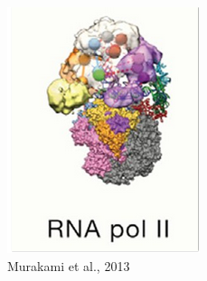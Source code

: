 \begin{frame}
\begin{figure}[h]
\begin{subfigure}[b]{0.3\textwidth}
            \includegraphics[width=\textwidth]{images/two.png}
            \caption{Murakami et al., 2013}
            \label{fig:image2}
        \end{subfigure}
        \hfill
        \begin{subfigure}[b]{0.3\textwidth}
            \centering

\end{subfigure}
\end{figure}
\end{frame}
